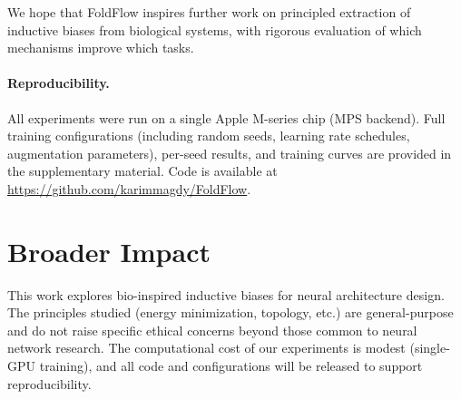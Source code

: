 \documentclass[10pt]{article}
\begin{document}
We hope that FoldFlow inspires further work on principled extraction
of inductive biases from biological systems, with rigorous evaluation
of which mechanisms improve which tasks.

\paragraph{Reproducibility.}
All experiments were run on a single Apple M-series chip (MPS backend).  Full
training configurations (including random seeds, learning rate
schedules, augmentation parameters), per-seed results, and
training curves are provided in the supplementary material.
Code is available at \url{https://github.com/karimmagdy/FoldFlow}.

\section*{Broader Impact}
This work explores bio-inspired inductive biases for neural architecture design. The principles studied (energy minimization, topology, etc.) are general-purpose and do not raise specific ethical concerns beyond those common to neural network research. The computational cost of our experiments is modest (single-GPU training), and all code and configurations will be released to support reproducibility.


\end{document}

